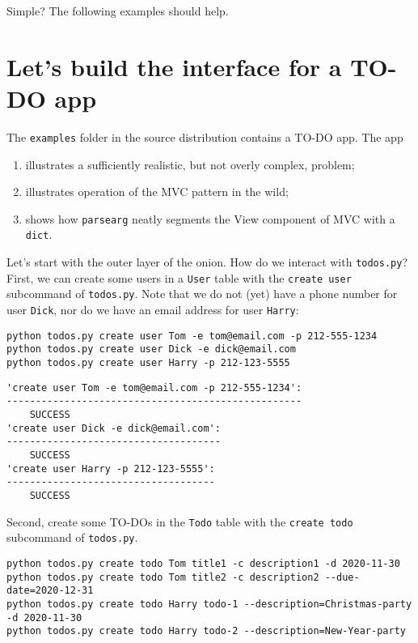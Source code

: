 \documentclass[10pt]{amsart}
\numberwithin{equation}{section}
\begin{document}
Simple? The following examples should help.

\section{Let's build the interface for a TO-DO app}
\label{sec:org026c1a2}
The \texttt{examples} folder in the source distribution contains a TO-DO app.
The app

\begin{enumerate}
\item illustrates a sufficiently realistic, but not overly complex, problem;
\item illustrates operation of the MVC pattern in the wild;
\item shows how \texttt{parsearg} neatly segments the View component of MVC with a \texttt{dict}.
\end{enumerate}

Let's start with the outer layer of the onion. How do we interact with
\texttt{todos.py}?  First, we can create some users in a \texttt{User} table with the 
\texttt{create user} subcommand of \texttt{todos.py}.  Note that we do not (yet) have a phone
number for user \texttt{Dick}, nor do we have an email address for user \texttt{Harry}:
\begin{verbatim}
python todos.py create user Tom -e tom@email.com -p 212-555-1234
python todos.py create user Dick -e dick@email.com
python todos.py create user Harry -p 212-123-5555
\end{verbatim}

\begin{verbatim}
'create user Tom -e tom@email.com -p 212-555-1234':
---------------------------------------------------
	SUCCESS
'create user Dick -e dick@email.com':
-------------------------------------
	SUCCESS
'create user Harry -p 212-123-5555':
------------------------------------
	SUCCESS
\end{verbatim}


Second, create some TO-DOs in the \texttt{Todo} table with the \texttt{create todo} subcommand of \texttt{todos.py}. 
\begin{verbatim}
python todos.py create todo Tom title1 -c description1 -d 2020-11-30
python todos.py create todo Tom title2 -c description2 --due-date=2020-12-31
python todos.py create todo Harry todo-1 --description=Christmas-party -d 2020-11-30
python todos.py create todo Harry todo-2 --description=New-Year-party
\end{verbatim}
\end{document}
